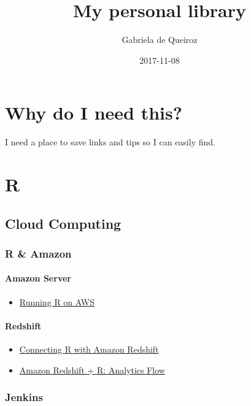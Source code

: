 \documentclass[]{book}
\title{My personal library}
\author{Gabriela de Queiroz}
\date{2017-11-08}
\providecommand{\tightlist}{%
  \setlength{\itemsep}{0pt}\setlength{\parskip}{0pt}}
\theoremstyle{definition}
\theoremstyle{definition}
\theoremstyle{definition}
\theoremstyle{remark}
\begin{document}
\maketitle

{
\setcounter{tocdepth}{1}
\tableofcontents
}
\chapter{Why do I need this?}\label{why-do-i-need-this}

I need a place to save links and tips so I can easily find.

\chapter{R}\label{r}

\section{Cloud Computing}\label{cloud-computing}

\subsection{R \& Amazon}\label{r-amazon}

\subsubsection{Amazon Server}\label{amazon-server}

\begin{itemize}
\tightlist
\item
  \href{https://aws.amazon.com/blogs/big-data/running-r-on-aws/}{Running
  R on AWS}
\end{itemize}

\subsubsection{Redshift}\label{redshift}

\begin{itemize}
\tightlist
\item
  \href{https://aws.amazon.com/blogs/big-data/connecting-r-with-amazon-redshift/}{Connecting
  R with Amazon Redshift}
\item
  \href{http://oobaloo.co.uk/amazon-redshift-plus-r-analytics-flow}{Amazon
  Redshift + R: Analytics Flow}
\end{itemize}

\subsection{Jenkins}\label{jenkins}
\end{document}
